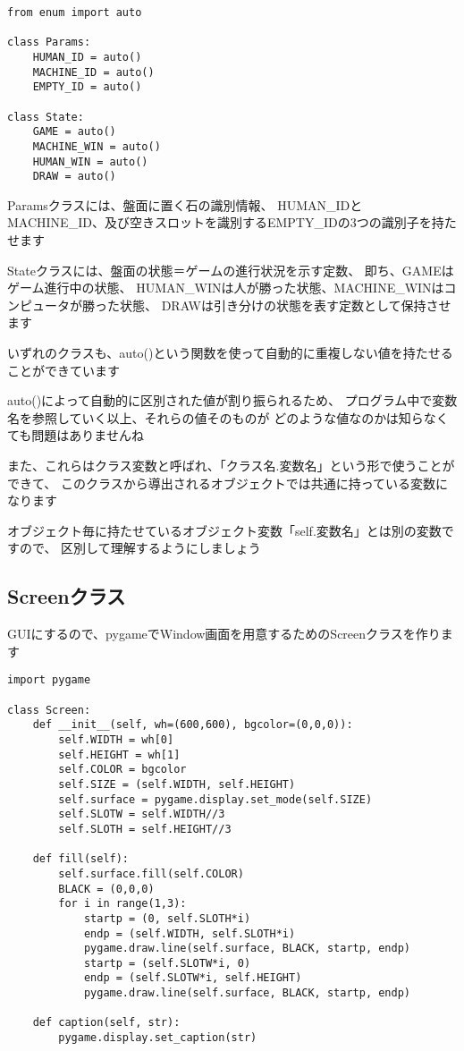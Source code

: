 \documentclass[uplatex,a4paper,11pt,oneside,openany]{jsbook}
\begin{document}
\begin{lstlisting}[caption=Params.py,label=prog05-1]
from enum import auto

class Params:
    HUMAN_ID = auto()
    MACHINE_ID = auto()
    EMPTY_ID = auto()

class State:
    GAME = auto()
    MACHINE_WIN = auto()
    HUMAN_WIN = auto()
    DRAW = auto()
\end{lstlisting}%

Paramsクラスには、盤面に置く石の識別情報、
HUMAN\_IDとMACHINE\_ID、及び空きスロットを識別するEMPTY\_IDの3つの識別子を持たせます

Stateクラスには、盤面の状態＝ゲームの進行状況を示す定数、
即ち、GAMEはゲーム進行中の状態、
HUMAN\_WINは人が勝った状態、MACHINE\_WINはコンピュータが勝った状態、
DRAWは引き分けの状態を表す定数として保持させます

いずれのクラスも、auto()という関数を使って自動的に重複しない値を持たせることができています

auto()によって自動的に区別された値が割り振られるため、
プログラム中で変数名を参照していく以上、それらの値そのものが
どのような値なのかは知らなくても問題はありませんね

また、これらはクラス変数と呼ばれ、「クラス名.変数名」という形で使うことができて、
このクラスから導出されるオブジェクトでは共通に持っている変数になります

オブジェクト毎に持たせているオブジェクト変数「self.変数名」とは別の変数ですので、
区別して理解するようにしましょう

\subsection{Screenクラス}

GUIにするので、pygameでWindow画面を用意するためのScreenクラスを作ります

\begin{lstlisting}[caption=class Screen,label=prog05-1]
import pygame

class Screen:
    def __init__(self, wh=(600,600), bgcolor=(0,0,0)):
        self.WIDTH = wh[0]
        self.HEIGHT = wh[1]
        self.COLOR = bgcolor
        self.SIZE = (self.WIDTH, self.HEIGHT)
        self.surface = pygame.display.set_mode(self.SIZE)
        self.SLOTW = self.WIDTH//3
        self.SLOTH = self.HEIGHT//3

    def fill(self):
        self.surface.fill(self.COLOR)
        BLACK = (0,0,0)
        for i in range(1,3):
            startp = (0, self.SLOTH*i)
            endp = (self.WIDTH, self.SLOTH*i)
            pygame.draw.line(self.surface, BLACK, startp, endp)
            startp = (self.SLOTW*i, 0)
            endp = (self.SLOTW*i, self.HEIGHT)
            pygame.draw.line(self.surface, BLACK, startp, endp)

    def caption(self, str):
        pygame.display.set_caption(str)
\end{lstlisting}%
\end{document}

